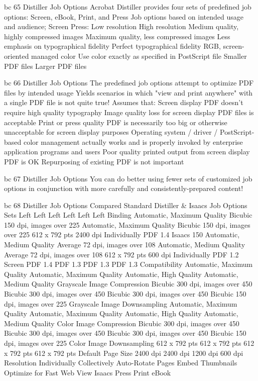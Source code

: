 \documentclass[11pt,a4paper]{article}
\begin{document}
bc 65 Distiller Job Options Acrobat Distiller provides four sets of predefined job options: Screen, eBook, Print, and Press Job options based on intended usage and audience; Screen Press: Low resolution High resolution Medium quality, highly compressed images Maximum quality, less compressed images Less emphasis on typographical fidelity Perfect typographical fidelity RGB, screen-oriented managed color Use color exactly as specified in PostScript file Smaller PDF files Larger PDF files

bc 66 Distiller Job Options The predefined job options attempt to optimize PDF files by intended usage Yields scenarios in which "view and print anywhere" with a single PDF file is not quite true! Assumes that: Screen display PDF doesn't require high quality typography Image quality loss for screen display PDF files is acceptable Print or press quality PDF is necessarily too big or otherwise unacceptable for screen display purposes Operating system / driver / PostScript-based color management actually works and is properly invoked by enterprise application programs and users Poor quality printed output from screen display PDF is OK Repurposing of existing PDF is not important

bc 67 Distiller Job Options You can do better using fewer sets of customized job options in conjunction with more carefully and consistently-prepared content!

bc 68 Distiller Job Options Compared Standard Distiller \& Isaacs Job Options Sets Left Left Left Left Left Left Binding Automatic, Maximum Quality Bicubic 150 dpi, images over 225 Automatic, Maximum Quality Bicubic 150 dpi, images over 225 612 x 792 pts 2400 dpi Individually PDF 1.4 Isaacs 150 Automatic, Medium Quality Average 72 dpi, images over 108 Automatic, Medium Quality Average 72 dpi, images over 108 612 x 792 pts 600 dpi Individually PDF 1.2 Screen PDF 1.4 PDF 1.3 PDF 1.3 PDF 1.3 Compatibility Automatic, Maximum Quality Automatic, Maximum Quality Automatic, High Quality Automatic, Medium Quality Grayscale Image Compression Bicubic 300 dpi, images over 450 Bicubic 300 dpi, images over 450 Bicubic 300 dpi, images over 450 Bicubic 150 dpi, images over 225 Grayscale Image Downsampling Automatic, Maximum Quality Automatic, Maximum Quality Automatic, High Quality Automatic, Medium Quality Color Image Compression Bicubic 300 dpi, images over 450 Bicubic 300 dpi, images over 450 Bicubic 300 dpi, images over 450 Bicubic 150 dpi, images over 225 Color Image Downsampling 612 x 792 pts 612 x 792 pts 612 x 792 pts 612 x 792 pts Default Page Size 2400 dpi 2400 dpi 1200 dpi 600 dpi Resolution Individually Collectively Auto-Rotate Pages Embed Thumbnails Optimize for Fast Web View Isaacs Press Print eBook
\end{document}
